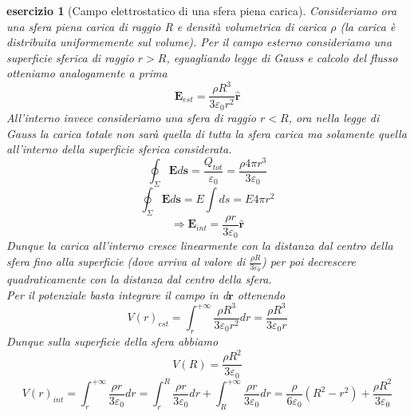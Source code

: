 \documentclass[10pt,a4paper]{article}
\newtheorem{esercizio}{esercizio}
\begin{document}
\begin{esercizio}[Campo elettrostatico di una sfera piena carica]
Consideriamo ora una sfera piena carica di raggio R e densità volumetrica di carica $\rho$ (la carica è distribuita uniformemente sul volume). Per il campo esterno consideriamo una superficie sferica di raggio \(r>R\), eguagliando legge di Gauss e calcolo del flusso otteniamo analogamente a prima 
\[\mathbf{E}_{est} = \frac{\rho R^3}{3 \varepsilon_0 r^2}\hat{\mathbf{r}}\]
All'interno invece consideriamo una sfera di raggio \(r<R\), ora nella legge di Gauss la carica totale non sarà quella di tutta la sfera carica ma solamente quella all'interno della superficie sferica considerata. 
\[\oint_{\Sigma}\mathbf{E}d\mathbf{s}=\frac{Q_{tot}}{\varepsilon_0} = \frac{\rho 4 \pi r^3}{3\varepsilon_0}\]
\[\oint_{\Sigma}\mathbf{E}d\mathbf{s}=E\int ds = E 4\pi r^2\]
\[\Rightarrow \mathbf{E}_{int} = \frac{\rho r}{3 \varepsilon_0}\hat{\mathbf{r}}\]
Dunque la carica all'interno cresce linearmente con la distanza dal centro della sfera fino alla superficie (dove arriva al valore di \(\frac{\rho R}{3 \varepsilon_0}\)) per poi decrescere quadraticamente con la distanza dal centro della sfera.\\
Per il potenziale basta integrare il campo in d$\mathbf{r}$ ottenendo
\[V(r)_{est} = \int_{r}^{+\infty} \frac{\rho R^3}{3 \varepsilon_0 r^2}dr = \frac{\rho R^3}{3 \varepsilon_0 r}\]
Dunque sulla superficie della sfera abbiamo
\[V(R) = \frac{\rho R^2}{3 \varepsilon_0 }\]
\[V(r)_{int} = \int_{r}^{+\infty} \frac{\rho r}{3 \varepsilon_0} dr = \int_{r}^{R}\frac{\rho r}{3 \varepsilon_0} dr+\int_{R}^{+\infty}\frac{\rho r}{3 \varepsilon_0} dr =\frac{\rho}{6\varepsilon_0}\left(R^2-r^2\right) +\frac{\rho R^2}{3 \varepsilon_0 }\]
\end{esercizio}
\end{document}
